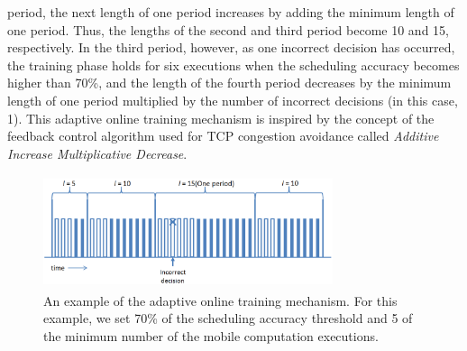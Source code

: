 \documentclass[10pt, conference, compsocconf]{IEEEtran}
\begin{document}
{{period, the next length of one period increases by adding the
minimum length of one period.
%
Thus, the lengths of the second and third period become 10 and 15,
respectively.
%
In the third period, however, as one incorrect decision has
occurred, the training phase holds for six executions when the
scheduling accuracy becomes higher than 70\%, and the length of the
fourth period decreases by the minimum length of one period multiplied
by the number of incorrect decisions (in this case, 1).
%
This adaptive online training mechanism is inspired by the concept of
the feedback control algorithm used for TCP congestion avoidance called
\textit{Additive Increase Multiplicative Decrease}.
%
%
\begin{figure}
\centering
\includegraphics[height=3.3cm, width=8.5cm]{Figure/figure2}
\caption{An example of the adaptive online training mechanism. For this
example, we set 70\% of the scheduling accuracy threshold and 5 of the
minimum number of the mobile computation executions.}
\end{figure}
%
}}
\end{document}
